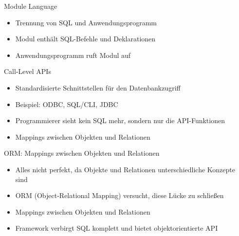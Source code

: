 \documentclass{article}
\begin{document}
\begin{block}{Module Language}
  \begin{itemize}
    \item Trennung von SQL und Anwendungsprogramm
    \item Modul enthält SQL-Befehle und Deklarationen
    \item Anwendungsprogramm ruft Modul auf
  \end{itemize}
\end{block}

\begin{block}{Call-Level APIs}
  \begin{itemize}
    \item Standardisierte Schnittstellen für den Datenbankzugriff
    \item Beispiel: ODBC, SQL/CLI, JDBC
    \item Programmierer sieht kein SQL mehr, sondern nur die API-Funktionen
    \item Mappings zwischen Objekten und Relationen
  \end{itemize}
\end{block}

\begin{block}{ORM: Mappings zwischen Objekten und Relationen}
  \begin{itemize}
    \item Alles nicht perfekt, da Objekte und Relationen unterschiedliche Konzepte sind
    \item ORM (Object-Relational Mapping) versucht, diese Lücke zu schließen
    \item Mappings zwischen Objekten und Relationen
    \item Framework verbirgt SQL komplett und bietet objektorientierte API
  \end{itemize}
\end{block}
\end{document}
